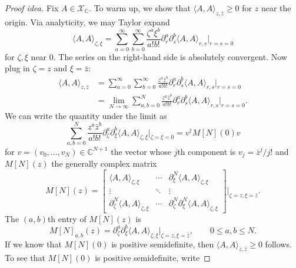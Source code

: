 \documentclass[11pt, letterpaper, reqno]{amsart}
\theoremstyle{definition}
\theoremstyle{remark}
\newcommand{\bbC}{\mathbb{C}}
\newcommand{\calX}{\mathcal{X}}
\begin{document}
\begin{proof}[Proof idea]
Fix $A\in\calX_\bbC$.
To warm up, we show that $\langle A,A\rangle_{z,\bar z}\geq0$
for $z$ near the origin. Via analyticity, we may Taylor expand
\begin{equation}
 \langle A,A\rangle_{\zeta,\xi}
 =\sum_{a=0}^\infty\sum_{b=0}^\infty
 \frac{\zeta^a\xi^b}{a!b!}
 \partial_r^a\partial_s^b\langle A,A\rangle_{r,s}
 \Big|_{r=s=0}
\end{equation}
for $\zeta,\xi$ near $0$. The series on the right-hand side is
absolutely convergent. Now plug in $\zeta=z$ and $\xi=\bar z$:
\begin{equation}
\begin{split}
 \langle A,A\rangle_{z,\bar z}
 &=\sum_{a=0}^\infty\sum_{b=0}^\infty
 \frac{z^a\bar z^b}{a!b!}
 \partial_r^a\partial_s^b\langle A,A\rangle_{r,s}
 \Big|_{r=s=0}\\
 &=\lim_{N\to\infty}\sum_{a,b=0}^N
 \frac{z^a\bar z^b}{a!b!}
 \partial_r^a\partial_s^b\langle A,A\rangle_{r,s}
 \Big|_{r=s=0}.
\end{split}
\end{equation}
We can write the quantity under the limit as
\begin{equation}
 \sum_{a,b=0}^N\frac{z^a\bar z^b}{a!b!}
 \partial_\zeta^a\partial_\xi^b
 \langle A,A\rangle_{\zeta,\xi}\Big|_{\zeta=\xi=0}
 =v^\dagger M[N](0)v
\end{equation}
for $v=(v_0,\dots,v_N)\in\bbC^{N+1}$ the vector whose $j$th
component is $v_j=\bar z^j/j!$ and $M[N](z)$ the generally complex
matrix
\begin{equation}
 M[N](z)=
 \begin{bmatrix}
 \langle A,A\rangle_{\zeta,\xi}&\cdots&
   \partial_\xi^N\langle A,A\rangle_{\zeta,\xi}\\
 \vdots&\ddots&\vdots\\
 \partial_\zeta^N\langle A,A\rangle_{\zeta,\xi}&\cdots&
   \partial_\zeta^N\partial_\xi^N\langle A,A\rangle_{\zeta,\xi}
 \end{bmatrix}\Bigg|_{\zeta=z,\xi=\bar z}.
\end{equation}
The $(a,b)$th entry of $M[N](z)$ is
\begin{equation}\label{eq:reflection-derivative-matrices}
 M[N]_{a,b}(z)=\partial_\zeta^a\partial_\xi^b
 \langle A,A\rangle_{\zeta,\xi}\Big|_{\zeta=z,\xi=\bar z},
 \qquad0\leq a,b\leq N.
\end{equation}
If we know that $M[N](0)$ is positive semidefinite, then
$\langle A,A\rangle_{z,\bar z}\geq0$ follows.
To see that $M[N](0)$ is positive semidefinite, write

\end{proof}
\end{document}
